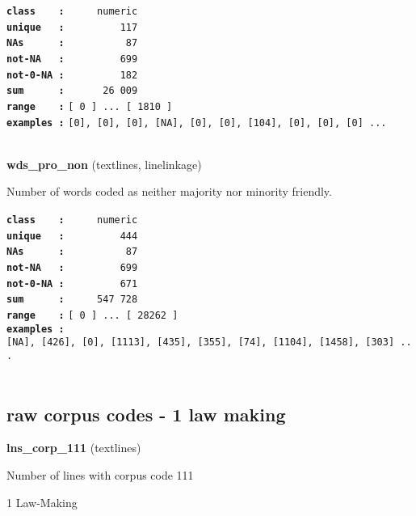 \documentclass[]{article}
\begin{document}
\textbf{\texttt{class\ \ \ \ :}} \texttt{~~~~~numeric}\\
\textbf{\texttt{unique\ \ \ :}} \texttt{~~~~~~~~~117}\\
\textbf{\texttt{NAs\ \ \ \ \ \ :}} \texttt{~~~~~~~~~~87}\\
\textbf{\texttt{not-NA\ \ \ :}} \texttt{~~~~~~~~~699}\\
\textbf{\texttt{not-0-NA\ :}} \texttt{~~~~~~~~~182}\\
\textbf{\texttt{sum\ \ \ \ \ \ :}} \texttt{~~~~~~26~009}\\
\textbf{\texttt{range\ \ \ \ :}}
\texttt{{[}\ 0\ {]}\ ...\ {[}\ 1810\ {]}}\\
\textbf{\texttt{examples\ :}}
\texttt{{[}0{]},\ {[}0{]},\ {[}0{]},\ {[}NA{]},\ {[}0{]},\ {[}0{]},\ {[}104{]},\ {[}0{]},\ {[}0{]},\ {[}0{]}\ ...}\\

~

\textbf{wds\_pro\_non} (textlines, linelinkage)

Number of words coded as neither majority nor minority friendly.

\textbf{\texttt{class\ \ \ \ :}} \texttt{~~~~~numeric}\\
\textbf{\texttt{unique\ \ \ :}} \texttt{~~~~~~~~~444}\\
\textbf{\texttt{NAs\ \ \ \ \ \ :}} \texttt{~~~~~~~~~~87}\\
\textbf{\texttt{not-NA\ \ \ :}} \texttt{~~~~~~~~~699}\\
\textbf{\texttt{not-0-NA\ :}} \texttt{~~~~~~~~~671}\\
\textbf{\texttt{sum\ \ \ \ \ \ :}} \texttt{~~~~~547~728}\\
\textbf{\texttt{range\ \ \ \ :}}
\texttt{{[}\ 0\ {]}\ ...\ {[}\ 28262\ {]}}\\
\textbf{\texttt{examples\ :}}
\texttt{{[}NA{]},\ {[}426{]},\ {[}0{]},\ {[}1113{]},\ {[}435{]},\ {[}355{]},\ {[}74{]},\ {[}1104{]},\ {[}1458{]},\ {[}303{]}\ ...}\\

~

\subsection{raw corpus codes - 1 law
making}\label{raw-corpus-codes---1-law-making}

\textbf{lns\_corp\_111} (textlines)

Number of lines with corpus code 111

1 Law-Making
\end{document}
